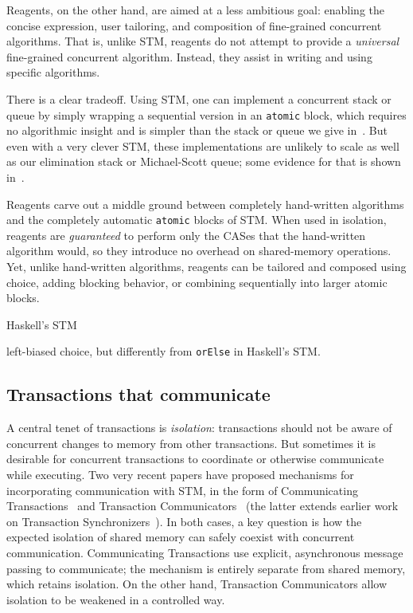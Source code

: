 \documentclass[preprint]{sigplanconf}
\begin{document}
Reagents, on the other hand, are aimed at a less ambitious goal: enabling the
concise expression, user tailoring, and composition of fine-grained concurrent
algorithms.  That is, unlike STM, reagents do not attempt to provide a
\emph{universal} fine-grained concurrent algorithm.  Instead, they assist in
writing and using specific algorithms.  

There is a clear tradeoff.  Using STM, one can implement a concurrent stack or
queue by simply wrapping a sequential version in an \lstinline{atomic} block,
which requires no algorithmic insight and is simpler than the stack or queue
we give in~.  But even with a very clever STM, these
implementations are unlikely to scale as well as our elimination stack or
Michael-Scott queue; some evidence for that is shown in~.

Reagents carve out a middle ground between completely hand-written algorithms
and the completely automatic \lstinline{atomic} blocks of STM.  When used in
isolation, reagents are \emph{guaranteed} to perform only the CASes that the
hand-written algorithm would, so they introduce no overhead on shared-memory
operations.  Yet, unlike hand-written algorithms,
reagents can be tailored and composed using choice, adding blocking behavior,
or combining sequentially into larger atomic blocks. %

Haskell's STM~\cite{Harris2005a}

left-biased choice, but differently from \lstinline{orElse} in
Haskell's STM.

\subsection{Transactions that communicate}

A central tenet of transactions is \emph{isolation}: transactions should not
be aware of concurrent changes to memory from other transactions.  But
sometimes it is desirable for concurrent transactions to coordinate or
otherwise communicate while executing.  Two very recent papers have proposed
mechanisms for incorporating communication with STM, in the form of
Communicating Transactions~\cite{Lesani2011} and Transaction
Communicators~\cite{Luchangco2011b} (the latter extends earlier work on
Transaction Synchronizers~\cite{Luchangco2005}).  In both cases, a key
question is how the expected isolation of shared memory can safely coexist
with concurrent communication.  Communicating Transactions use explicit,
asynchronous message passing to communicate; the mechanism is entirely
separate from shared memory, which retains isolation.  On the other hand,
Transaction Communicators allow isolation to be weakened in a controlled way.
\end{document}
